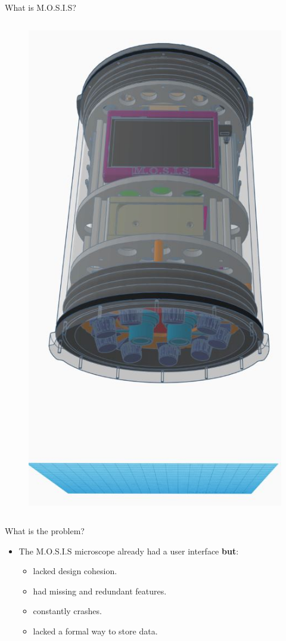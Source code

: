 \documentclass[17pt, aspectratio=169]{beamer}
\begin{document}
\begin{frame}{What is M.O.S.I.S?}
\begin{columns}
		\centering
		\begin{figure}
			\includegraphics[height=0.85\textheight]{./Figures/M.O.S.I.S_Model.jpeg}
		\end{figure}
	\end{columns}
\end{frame}
\begin{frame}{What is the problem?}
	\begin{itemize}
		\item The M.O.S.I.S microscope already had a user interface \textbf{but}:
		      \begin{itemize}
			      \item lacked design cohesion.
			      \item had missing and redundant features.
			      \item constantly crashes.
			      \item lacked a formal way to store data.
		      \end{itemize}
	\end{itemize}
\end{frame}
\end{document}
